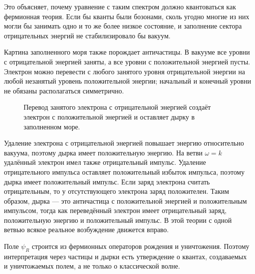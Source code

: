 Это объясняет, почему уравнение с таким спектром должно квантоваться как фермионная теория. Если бы кванты были бозонами, сколь угодно многие из них могли бы занимать одно и то же более низкое состояние, и заполнение сектора отрицательных энергий не стабилизировало бы вакуум.

Картина заполненного моря также порождает античастицы. В вакууме все уровни с отрицательной энергией заняты, а все уровни с положительной энергией пусты. Электрон можно перевести с любого занятого уровня отрицательной энергии на любой незанятый уровень положительной энергии; начальный и конечный уровни не обязаны располагаться симметрично.

\begin{figure}[htbp]
\centering
{}
\caption{Перевод занятого электрона с отрицательной энергией создаёт электрон с положительной энергией и оставляет дырку в заполненном море.}
\end{figure}

Удаление электрона с отрицательной энергией повышает энергию относительно вакуума, поэтому дырка имеет положительную энергию. На ветви \(\omega=k\) удалённый электрон имел также отрицательный импульс. Удаление отрицательного импульса оставляет положительный избыток импульса, поэтому дырка имеет положительный импульс. Если заряд электрона считать отрицательным, то у отсутствующего электрона заряд положителен. Таким образом, дырка — это античастица с положительной энергией и положительным импульсом, тогда как переведённый электрон имеет отрицательный заряд, положительную энергию и положительный импульс. В этой теории с одной ветвью всякое реальное возбуждение движется вправо.

Поле \(\psi_R\) строится из фермионных операторов рождения и уничтожения. Поэтому интерпретация через частицы и дырки есть утверждение о квантах, создаваемых и уничтожаемых полем, а не только о классической волне.

